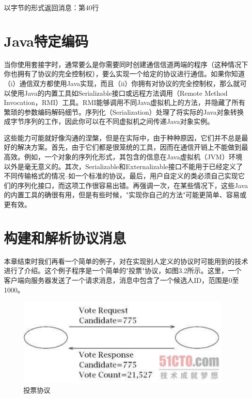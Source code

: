 	以字节的形式返回消息：第40行 


\section{Java特定编码}

	当你使用套接字时，通常要么是你需要同时创建通信信道两端的程序（这种情况下你也拥有了协议的完全控制权），要么实现一个给定的协议进行通信。如果你知道（i）通信双方都使用Java实现，而且（ii）你拥有对协议的完全控制权，那么就可以使用Java的内置工具如Serializable接口或远程方法调用（Remote Method Invocation，RMI）工具。RMI能够调用不同Java虚拟机上的方法，并隐藏了所有繁琐的参数编码解码细节。序列化（Serialization）处理了将实际的Java对象转换成字节序列的工作，因此你可以在不同虚拟机之间传递Java对象实例。

	这些能力可能就好像沟通的涅槃，但是在实际中，由于种种原因，它们并不总是最好的解决方案。首先，由于它们都是很笼统的工具，因而在通信开销上不能做到最高效。例如，一个对象的序列化形式，其包含的信息在Java虚拟机（JVM）环境以外是毫无意义的。其次，Serializable和Externalizable接口不能用于已经定义了不同传输格式的情况--如一个标准的协议。最后，用户自定义的类必须自己实现它们的序列化接口，而这项工作很容易出错。再强调一次，在某些情况下，这些Java的内置工具的确很有用，但是有些时候，"实现你自己的方法"可能更简单、容易或更有效。 


\section{构建和解析协议消息}

	本章结束时我们再看一个简单的例子，对在实现别人定义的协议时可能用到的技术进行了介绍。这个例子程序是一个简单的"投票"协议，如图3.2所示。这里，一个客户端向服务器发送了一个请求消息，消息中包含了一个候选人ID，范围是0至1000。 


	\begin{figure}[htbp]%
		\centering
		\includegraphics[scale=.8]{img/03.02.png}
		\caption{投票协议}
		\label{fig:vote.prot}
	\end{figure}

